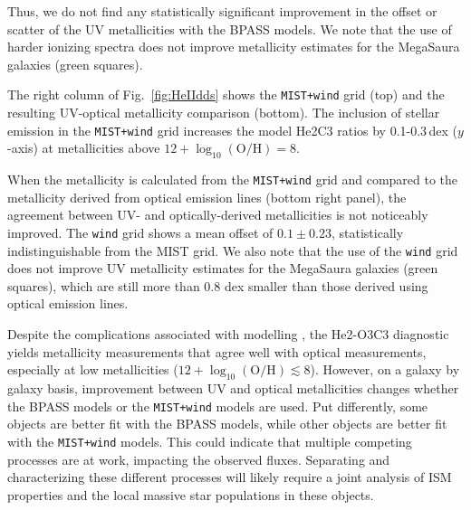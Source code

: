\documentclass[trackchanges, preprint2]{aastex62}
\newcommand{\heii}{\ion{He}{2}}
\newcommand{\logten}{\ensuremath{\log_{10}}}
\newcommand{\logOH}{\ensuremath{\logten (\mathrm{O}/\mathrm{H})}\xspace}
\newcommand{\mage}{{\sc Meg}a{\sc S}a{\sc ura}\xspace}
\begin{document}
Thus, we do not find any statistically significant improvement in the offset or scatter of the UV metallicities with the BPASS models. We note that the use of harder ionizing spectra does not improve metallicity estimates for the \mage galaxies (green squares).

The right column of Fig.~\ref{fig:HeIIdds} shows the {\tt MIST+wind} grid (top) and the resulting UV-optical metallicity comparison (bottom). The inclusion of stellar \heii{} emission in the {\tt MIST+wind} grid increases the model He2C3 ratios by 0.1-0.3\,dex ($y$-axis) at metallicities above $12+\logOH=8$.

When the metallicity is calculated from the {\tt MIST+wind} grid and compared to the metallicity derived from optical emission lines (bottom right panel), the agreement between UV- and optically-derived metallicities is not noticeably improved. The {\tt wind} grid shows a mean offset of $0.1\pm 0.23$, statistically indistinguishable from the MIST grid. We also note that the use of the {\tt wind} grid does not improve UV metallicity estimates for the \mage galaxies (green squares), which are still more than 0.8 dex smaller than those derived using optical emission lines. 

Despite the complications associated with modelling \heii{}, the He2-O3C3 diagnostic yields metallicity measurements that agree well with optical measurements, especially at low metallicities ($12+\logOH \lesssim 8$). However, on a galaxy by galaxy basis, improvement between UV and optical metallicities changes whether the BPASS models or the {\tt MIST+wind} models are used. Put differently, some objects are better fit with the BPASS models, while other objects are better fit with the {\tt MIST+wind} models. This could indicate that multiple competing processes are at work, impacting the observed \heii{} fluxes. Separating and characterizing these different processes will likely require a joint analysis of ISM properties and the local massive star populations in these objects.
\end{document}
